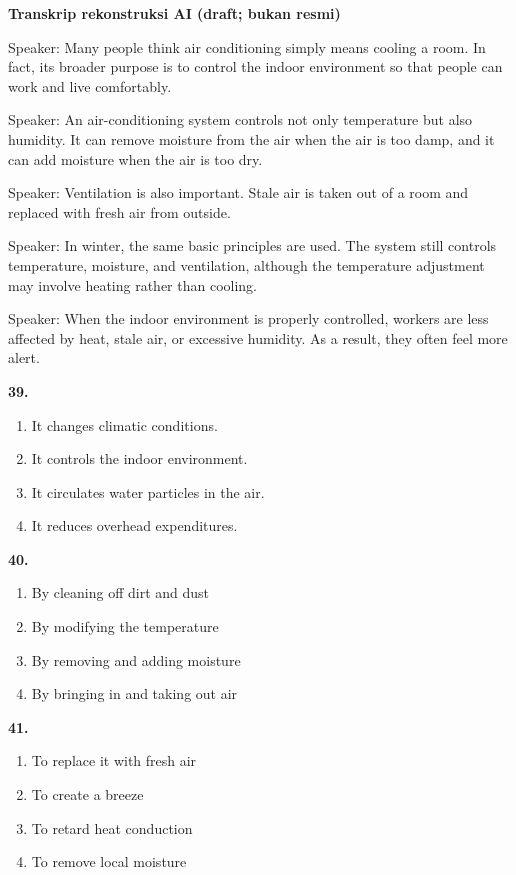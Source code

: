 \documentclass[12pt]{article}
\begin{document}
\begin{exampleblock}
\textbf{Transkrip rekonstruksi AI (draft; bukan resmi)}\par
Speaker: Many people think air conditioning simply means cooling a room. In fact, its broader purpose is to control the indoor environment so that people can work and live comfortably.\par
Speaker: An air-conditioning system controls not only temperature but also humidity. It can remove moisture from the air when the air is too damp, and it can add moisture when the air is too dry.\par
Speaker: Ventilation is also important. Stale air is taken out of a room and replaced with fresh air from outside.\par
Speaker: In winter, the same basic principles are used. The system still controls temperature, moisture, and ventilation, although the temperature adjustment may involve heating rather than cooling.\par
Speaker: When the indoor environment is properly controlled, workers are less affected by heat, stale air, or excessive humidity. As a result, they often feel more alert.\par
\end{exampleblock}
\noindent\textbf{39.}
\begin{enumerate}[label=(\Alph*),leftmargin=*,itemsep=0.2em]
\item It changes climatic conditions.
\item It controls the indoor environment.
\item It circulates water particles in the air.
\item It reduces overhead expenditures.
\end{enumerate}
\par
\vspace{0.25\baselineskip}
\noindent\textbf{40.}
\begin{enumerate}[label=(\Alph*),leftmargin=*,itemsep=0.2em]
\item By cleaning off dirt and dust
\item By modifying the temperature
\item By removing and adding moisture
\item By bringing in and taking out air
\end{enumerate}
\par
\vspace{0.25\baselineskip}
\noindent\textbf{41.}
\begin{enumerate}[label=(\Alph*),leftmargin=*,itemsep=0.2em]
\item To replace it with fresh air
\item To create a breeze
\item To retard heat conduction
\item To remove local moisture
\end{enumerate}
\end{document}

